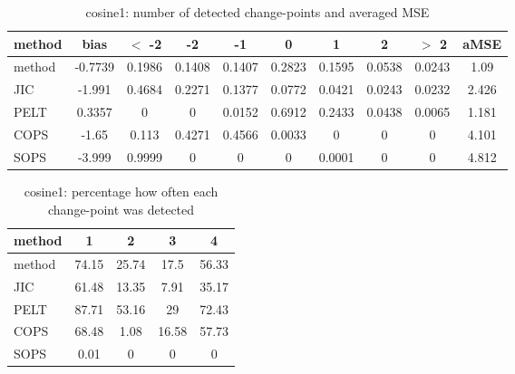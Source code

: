 \begin{table}[ht]
\centering
\begin{tabular}{l|c|ccccccc|c}
  \hline
method & bias & $<$ -2 & -2 & -1 & 0 & 1 & 2 & $>$ 2 & aMSE \\ 
  \hline
method & -0.7739 & 0.1986 & 0.1408 & 0.1407 & 0.2823 & 0.1595 & 0.0538 & 0.0243 &  1.09 \\ 
  JIC & -1.991 & 0.4684 & 0.2271 & 0.1377 & 0.0772 & 0.0421 & 0.0243 & 0.0232 & 2.426 \\ 
  PELT & 0.3357 &     0 &     0 & 0.0152 & 0.6912 & 0.2433 & 0.0438 & 0.0065 & 1.181 \\ 
  COPS & -1.65 & 0.113 & 0.4271 & 0.4566 & 0.0033 &     0 &     0 &     0 & 4.101 \\ 
  SOPS & -3.999 & 0.9999 &     0 &     0 &     0 & 0.0001 &     0 &     0 & 4.812 \\ 
   \hline
\end{tabular}
\caption{cosine1: number of detected change-points and averaged MSE} 
\label{tab:cosine1Njumps}
\end{table}
\begin{table}[ht]
\centering
\begin{tabular}{l|cccc}
  \hline
method & 1 & 2 & 3 & 4 \\ 
  \hline
method &  74.15 &  25.74 &   17.5 &  56.33 \\ 
  JIC &  61.48 &  13.35 &   7.91 &  35.17 \\ 
  PELT &  87.71 &  53.16 &     29 &  72.43 \\ 
  COPS &  68.48 &   1.08 &  16.58 &  57.73 \\ 
  SOPS &   0.01 &      0 &      0 &      0 \\ 
   \hline
\end{tabular}
\caption{cosine1: percentage how often each change-point was detected} 
\label{tab:cosine1Detections}
\end{table}
